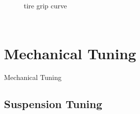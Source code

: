 \documentclass{beamer}
\begin{document}
\begin{frame}
\begin{columns}[t]
\begin{figure}
    tire grip curve
  \end{figure}
\end{columns}
\end{frame}

\section{Mechanical Tuning} %
\begin{frame}
\centering \huge Mechanical Tuning
\end{frame}

\subsection{Suspension Tuning}
\end{document}
